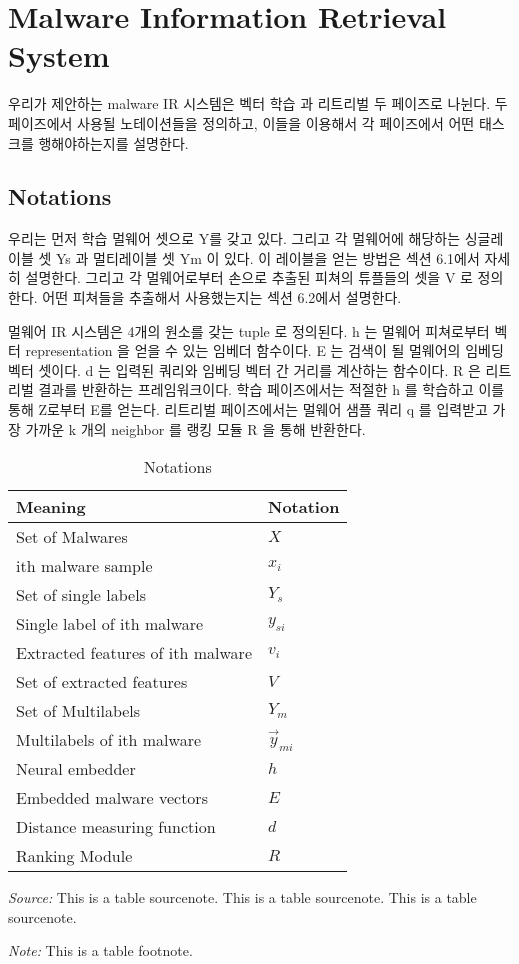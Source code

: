 \section{Malware Information Retrieval System}

우리가 제안하는 malware IR 시스템은 벡터 학습 과 리트리벌 두 페이즈로 나뉜다. 두 페이즈에서 사용될 노테이션들을 정의하고, 이들을 이용해서 각 페이즈에서 어떤 태스크를 행해야하는지를 설명한다. 

\subsection{Notations}

우리는 먼저 학습 멀웨어 셋으로 Y를 갖고 있다. 그리고 각 멀웨어에 해당하는 싱글레이블 셋  Ys 과 멀티레이블 셋 Ym 이 있다. 이 레이블을 얻는 방법은 섹션 6.1에서 자세히 설명한다. 그리고 각 멀웨어로부터 손으로 추출된 피쳐의 튜플들의 셋을 V 로 정의한다. 어떤 피쳐들을 추출해서 사용했는지는 섹션 6.2에서 설명한다. 

멀웨어 IR 시스템은  4개의 원소를 갖는 tuple 로 정의된다. h 는 멀웨어 피쳐로부터 벡터 representation 을 얻을 수 있는 임베더 함수이다. E 는 검색이 될 멀웨어의 임베딩 벡터 셋이다. d 는 입력된 쿼리와 임베딩 벡터 간 거리를 계산하는 함수이다. R 은 리트리벌 결과를 반환하는 프레임워크이다. 학습 페이즈에서는 적절한 h 를 학습하고 이를 통해 Z로부터 E를 얻는다. 리트리벌 페이즈에서는 멀웨어 샘플 쿼리 q 를 입력받고 가장 가까운 k 개의 neighbor 를 랭킹 모듈 R 을 통해 반환한다.

\begin{table}%
\caption{Notations}
\label{tab:one}
\begin{minipage}{\columnwidth}
\begin{center}
\begin{tabular}{ll}
\toprule
Meaning & Notation\\
\midrule
  Set of Malwares     & $X$ \\
  ith malware sample  & $x_i$ \\
  Set of single labels & $Y_s$ \\
  Single label of ith malware    & $y_{si}$ \\
  Extracted features of ith malware & $v_i$ \\
  Set of extracted features   & $V$ \\
  Set of Multilabels   & $Y_m$ \\
  Multilabels of ith malware & $\vec{y}_{mi}$\\
  Neural embedder & $h$ \\
  Embedded malware vectors & $E$ \\
  Distance measuring function & $d$ \\
  Ranking Module & $R$\\
\bottomrule
\end{tabular}
\end{center}
\bigskip\centering
\footnotesize\emph{Source:} This is a table
 sourcenote. This is a table sourcenote. This is a table
 sourcenote.

 \emph{Note:} This is a table footnote.
\end{minipage}
\end{table}%



